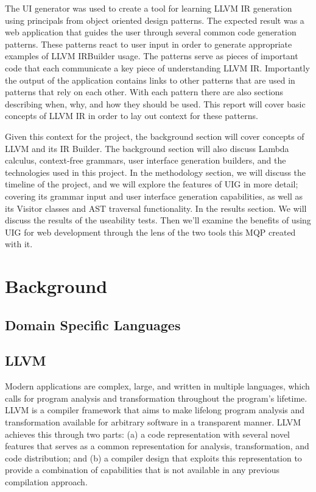 \documentclass[hidelinks,12pt]{article}
\begin{document}
\begin{doublespacing}
The UI generator was used to create a tool for learning LLVM IR generation using principals from object oriented design patterns. The expected result was a web application that guides the user through several common code generation patterns. These patterns react to user input in order to generate appropriate examples of LLVM IRBuilder usage. The patterns serve as pieces of important code that each communicate a key piece of understanding LLVM IR. Importantly the output of the application contains links to other patterns that are used in patterns that rely on each other. With each pattern there are also sections describing when, why, and how they should be used. This report will cover basic concepts of LLVM IR in order to lay out context for these patterns.

Given this context for the project, the background section will cover concepts of LLVM and its IR Builder. The background section will also discuss Lambda calculus, context-free grammars, user interface generation builders, and the technologies used in this project. In the methodology section, we will discuss the timeline of the project, and we will explore the features of UIG in more detail; covering its grammar input and user interface generation capabilities, as well as its Visitor classes and AST traversal functionality. In the results section. We will discuss the results of the useability tests. Then we'll examine the benefits of using UIG for web development through the lens of the two tools this MQP created with it.

\section{Background}
\subsection{Domain Specific Languages}
\subsection{LLVM}
Modern applications are complex, large, and written in multiple languages, which calls for program analysis and transformation throughout the program's lifetime. LLVM is a compiler framework that aims to make lifelong program analysis and transformation available for arbitrary software in a transparent manner. LLVM achieves this through two parts: (a) a code representation with several novel features that serves as a common representation for analysis, transformation, and code distribution; and (b) a compiler design that exploits this representation to provide a combination of capabilities that is not available in any previous compilation approach. 
\cite{lattner_llvm_2004}


\end{doublespacing}
\end{document}
